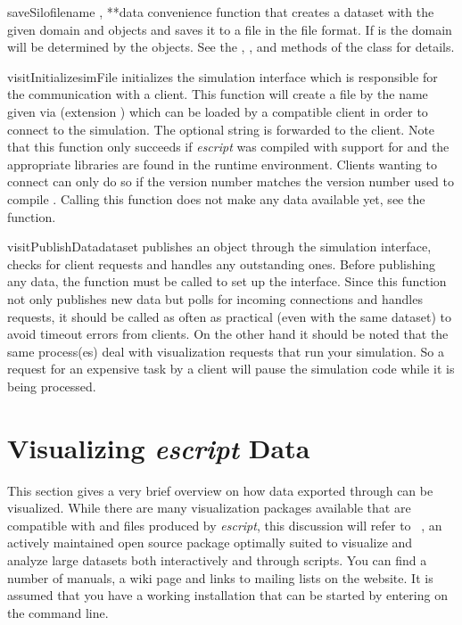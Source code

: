 \begin{funcdesc}{saveSilo}{filename , **data}
    convenience function that creates a dataset with the given domain and \Data
    objects and saves it to a file in the \SILO file format.
    If  is  the domain will be determined by the \Data
    objects.
    See the , , and 
    methods of the  class for details.
\end{funcdesc}

\begin{funcdesc}{visitInitialize}{simFile }
    initializes the \VisIt simulation interface which is responsible for the
    communication with a \VisIt client.
    This function will create a file by the name given via 
    (extension ) which can be loaded by a compatible \VisIt client
    in order to connect to the simulation. The optional  string
    is forwarded to the client.
    Note that this function only succeeds if {\it escript} was compiled with
    support for \VisIt and the appropriate libraries are found in the runtime
    environment. Clients wanting to connect can only do so if the version
    number matches the version number used to compile \weipa.
    Calling this function does not make any data available yet, see the
     function.
\end{funcdesc}

\begin{funcdesc}{visitPublishData}{dataset}
    publishes an  object through the \VisIt simulation
    interface, checks for client requests and handles any outstanding ones.
    Before publishing any data, the  function must be
    called to set up the interface.
    Since this function not only publishes new data but polls for incoming
    connections and handles requests, it should be called as often as practical
    (even with the same dataset) to avoid timeout errors from clients.
    On the other hand it should be noted that the same process(es) deal with
    visualization requests that run your simulation. So a request for an
    expensive task by a \VisIt client will pause the simulation code while it
    is being processed.
\end{funcdesc}

\section{Visualizing {\it escript} Data}
This section gives a very brief overview on how data exported through \weipa
can be visualized. While there are many visualization packages available that
are compatible with \VTK and \SILO files produced by {\it escript}, this
discussion will refer to \VisIt~\cite{VisIt}, an actively maintained open
source package optimally suited to visualize and analyze large datasets both
interactively and through \PYTHON scripts. You can find a number of manuals,
a wiki page and links to mailing lists on the \VisIt website.
It is assumed that you have a working \VisIt installation that can be started
by entering  on the command line.

